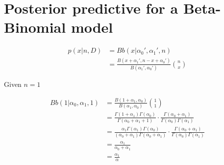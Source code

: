 \documentclass{article}
\begin{document}
\section{Posterior predictive for a Beta-Binomial model}

\begin{align*}
  p(x|n,D) &= Bb(x|\alpha_0', \alpha_1', n) \\
  &= \frac{B(x + \alpha_1', n-x+\alpha_0')}{B(\alpha_1',\alpha_0')} {n
    \choose x}
\end{align*}

Given $n = 1$

\begin{align*}
  Bb(1|\alpha_0,\alpha_1,1) &= \frac{B(1 + \alpha_1,
                              \alpha_0)}{B(\alpha_1, \alpha_0)} {1
                              \choose 1} \\
                            &= \frac{\Gamma(1 + \alpha_1)
                              \Gamma(\alpha_0)}{\Gamma(\alpha_0 +
                              \alpha_1 + 1)} \cdot
                              \frac{\Gamma(\alpha_0 +
                              \alpha_1)}{\Gamma(\alpha_0)\Gamma(\alpha_1)}
  \\
                            &= \frac{\alpha_1 \Gamma(\alpha_1)
                              \Gamma(\alpha_0)}{(\alpha_0 + \alpha_1)
                              \Gamma(\alpha_0 + \alpha_1)} \cdot
                              \frac{\Gamma(\alpha_0 +
                              \alpha_1)}{\Gamma(\alpha_0)\Gamma(\alpha_1)}
  \\
                            &= \frac{\alpha_1}{\alpha_0 + \alpha_1} \\
                            &= \frac{\alpha_1}{\alpha}
\end{align*}
\end{document}
